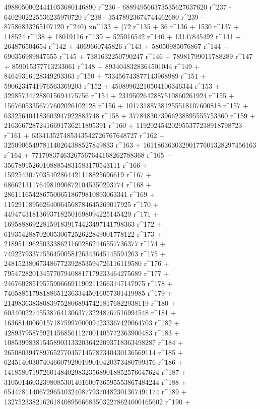        49880500024441053680146890 r^236 - 
       688949566373535627637620 r^237 - 
       6402902225536235970720 r^238 - 35478923674744462680 r^239 - 
       87586833265107120 r^240) xn^133 + (72 r^135 + 36 r^136 + 
       1530 r^137 + 118524 r^138 + 18019116 r^139 + 525016542 r^140 + 
       13147845492 r^141 + 264876504654 r^142 + 4069660745826 r^143 + 
       58050985076867 r^144 + 690356989847555 r^145 + 
       7381632250790247 r^146 + 78981799011788289 r^147 + 
       859015377713233061 r^148 + 8934048328364501044 r^149 + 
       84649316128349293363 r^150 + 733456743877143968989 r^151 + 
       5906234741976563369203 r^152 + 45089962210504106346344 r^153 + 
       329857347288015694475756 r^154 + 
       2319502642887510860261924 r^155 + 
       15676053356777602026102128 r^156 + 
       101731887381255518107600818 r^157 + 
       633256404183603947922883748 r^158 + 
       3778483073966238895555753360 r^159 + 
       21636672872416691736211895391 r^160 + 
       119202454202955377238918798723 r^161 + 
       633413527485343542726767648727 r^162 + 
       3250906549781140264388527849833 r^163 + 
       16118636303290177601328297456163 r^164 + 
       77179837463267567644168262788368 r^165 + 
       356789152601088854831583170543111 r^166 + 
       1592543077035402864421118825696619 r^167 + 
       6866213117649819908721045350293774 r^168 + 
       28611165428675006518679810893063341 r^169 + 
       115291189562640064568784645269017925 r^170 + 
       449474318136937182501698094225145429 r^171 + 
       1695888692281591839174423497141798363 r^172 + 
       6193542887020053067252622849001778122 r^173 + 
       21895119625033386211602862446557736377 r^174 + 
       74922793377556450058126343645145594263 r^175 + 
       248152380673486772392853594726116119580 r^176 + 
       795472820134577079408817179233464275689 r^177 + 
       2467602851957590666911902112663147147975 r^178 + 
       7405885179818865123633445016057301419985 r^179 + 
       21498363838083975280689474218176822938119 r^180 + 
       60340022745538764130637732248767516994548 r^181 + 
       163681400601571875997000094233367429064703 r^182 + 
       428937958759214568561127001405772363900483 r^183 + 
       1085399838154589031332036422093718363498287 r^184 + 
       2650803947897652770457145782340430136569114 r^185 + 
       6245140030740466079290199010420373480799376 r^186 + 
       14185807197260148402983235689018852576647624 r^187 + 
       31050146032398085301401600736595553867484244 r^188 + 
       65447811406729654032408779370482301367491174 r^189 + 
       132752338216261840895666835032278624600165602 r^190 + 
